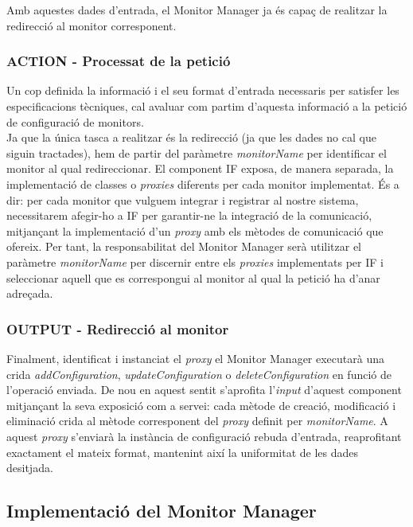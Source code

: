 Amb aquestes dades d'entrada, el Monitor Manager ja és capaç de realitzar la redirecció al monitor corresponent.

\subsubsection{ACTION - Processat de la petició}

Un cop definida la informació i el seu format d'entrada necessaris per satisfer les especificacions tècniques, cal avaluar com partim d'aquesta informació a la petició de configuració de monitors.\\

Ja que la única tasca a realitzar és la redirecció (ja que les dades no cal que siguin tractades), hem de partir del paràmetre \textit{monitorName} per identificar el monitor al qual redireccionar. El component IF exposa, de manera separada, la implementació de classes o \textit{proxies} diferents per cada monitor implementat. És a dir: per cada monitor que vulguem integrar i registrar al nostre sistema, necessitarem afegir-ho a IF per garantir-ne la integració de la comunicació, mitjançant la implementació d'un \textit{proxy} amb els mètodes de comunicació que ofereix. Per tant, la responsabilitat del Monitor Manager serà utilitzar el paràmetre \textit{monitorName} per discernir entre els \textit{proxies} implementats per IF i seleccionar aquell que es correspongui al monitor al qual la petició ha d'anar adreçada. 

\subsubsection{OUTPUT - Redirecció al monitor}

Finalment, identificat i instanciat el \textit{proxy} el Monitor Manager executarà una crida \textit{addConfiguration}, \textit{updateConfiguration} o \textit{deleteConfiguration} en funció de l'operació enviada. De nou en aquest sentit s'aprofita l'\textit{input} d'aquest component mitjançant la seva exposició com a servei: cada mètode de creació, modificació i eliminació crida al mètode corresponent del \textit{proxy} definit per \textit{monitorName}. A aquest \textit{proxy} s'enviarà la instància de configuració rebuda d'entrada, reaprofitant exactament el mateix format, mantenint així la uniformitat de les dades desitjada.

\subsection{Implementació del Monitor Manager}

